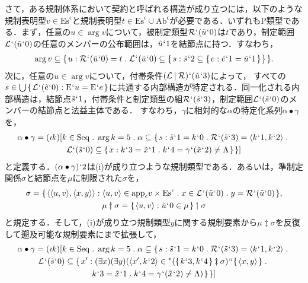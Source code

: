 さて，ある規制体系において契約と呼ばれる構造が成り立つには，以下のような規制表明型$v\in\mathrm{Es}^\epsilon $と規制表明型$t\in\mathrm{Es}^\epsilon\cup\mathrm{Ab}^\epsilon$が必要である．いずれもP類型である．まず，任意の$u\in \arg v$について，被制定類型$ \mathcal{R}{\mspace{1mu}{`}\mspace{1mu}}(\tilde{u}{\mspace{1mu}{`}\mspace{1mu}} 0) $は$t$であり，制定範囲$ \mathcal{L}{\mspace{1mu}{`}\mspace{1mu}}(\tilde{u}{\mspace{1mu}{`}\mspace{1mu}} 0) $の任意のメンバーの公布範囲は，$\tilde{u}{\mspace{1mu}{`}\mspace{1mu}} 1$を結節点に持つ．すなわち，
\begin{align*}
    \arg v\subseteq\classab{u:
    \mathcal{R}\fap(\tilde{u}\fap 0) = t\con{1}
            \mathcal{L}\fap(\tilde{u}\fap 0)\subseteq \classab{s:
                \tilde{s}\fap 2 \subseteq\classab{e:\tilde{e}\fap 1 = \tilde{u}\fap 1}
                }
    }.
\end{align*}
次に，任意の$ u\in\arg v $について，付帯条件$ (\mathcal{L}\mathbin{\mid}\mathcal{R}){\mspace{1mu}{`}\mspace{1mu}}(\tilde{u}{\mspace{1mu}{`}\mspace{1mu}} 3) $によって，
すべての$ s\in{\textstyle\bigcup}\mspace{3mu}\{\mspace{2mu}\mathcal{L}{\mspace{1mu}{`}\mspace{1mu}}(\tilde{e}{\mspace{1mu}{`}\mspace{1mu}} 0):\mathrm{E}{\mspace{1mu}{`}\mspace{1mu}} u = \mathrm{E}{\mspace{1mu}{`}\mspace{1mu}} e\mspace{2mu}\} $に共通する内部構造が特定される．同一化される内部構造は，結節点$ \tilde{s}{\mspace{1mu}{`}\mspace{1mu}} 1 $，付帯条件と制定類型の組$ \mathcal{R}{\mspace{1mu}{`}\mspace{1mu}}(\tilde{s}{\mspace{1mu}{`}\mspace{1mu}} 3) $，制定範囲$ \mathcal{L}{\mspace{1mu}{`}\mspace{1mu}}(\tilde{s}{\mspace{1mu}{`}\mspace{1mu}} 0) $のメンバーの結節点と法益主体である．
すなわち，$\gamma$に相対的な$\alpha$の特定化系列$ \alpha\bullet\gamma $を，
\begin{multline*}
    \alpha\bullet\gamma = (\imath k)[
        k\in\mathrm{Seq}\con{1}\arg k = 5\con{1}
        \alpha\subseteq\classab{s:\tilde{s}\fap 1 = k\fap 0\con{1}
        \mathcal{R}\fap(\tilde{s}\fap 3) = \orp{k\fap 1,k\fap 2}\con{1}\\
        \mathcal{L}\fap(\tilde{s}\fap 0)\subseteq \classab{x:k\fap 3= \tilde{x}\fap 1\con{1} k\fap 4 = \gamma\fap(\tilde{x}\fap 2)\neq\Lambda}
        }
    ]
\end{multline*}
と定義する．$ (\alpha\bullet\gamma){\mspace{1mu}{`}\mspace{1mu}} 2 $は(i)が成り立つような規制類型である．あるいは，準制定関係$\sigma$と結節点を$\mu$に制限された$\sigma$を，
\begin{gather*}
    \sigma = \classab{\orp{\orp{u,v},\orp{x,y}}:
    \orp{u,v}\in\app{\epsilon} v\times \mathrm{Es}^\epsilon\con{1}
    x\in \mathcal{L}\fap(\tilde{u}\fap 0)\con{1}y = \mathcal{R}\fap(\tilde{u}\fap 0)
    },\\
    \mu \ddagger\sigma = \classab{\orp{u,v}:\tilde{u}\fap 0 \in\mu}\uphl\sigma
\end{gather*}
と規定する．そして，(i)が成り立つ規制類型$y$に関する規制要素から$\mu \ddagger\sigma$を反復して遡及可能な規制要素にまで拡張して，
\begin{multline*}
    \alpha\bullet\gamma = (\imath k)[
        k\in\mathrm{Seq}\con{1}\arg k = 5\con{1}
        \alpha\subseteq\classab{s:\tilde{s}\fap 1 = k\fap 0\con{1}
        \mathcal{R}\fap(\tilde{s}\fap 3) = \orp{k\fap 1,k\fap 2}\con{1}\\
        \mathcal{L}\fap(\tilde{s}\fap 0)\subseteq\classab{x':
            (\exists x)(\exists y)(
            \orp{x',k\fap 2}\in\ance{(\classab{k\fap 3,k\fap 4}\ddagger\sigma)}\img\classab{\orp{x,y}}\con{1}\\
            k\fap 3= \tilde{x}\fap 1\con{1} k\fap 4 = \gamma\fap(\tilde{x}\fap 2)\neq\Lambda
            )
        }
        }
    ]
\end{multline*}
